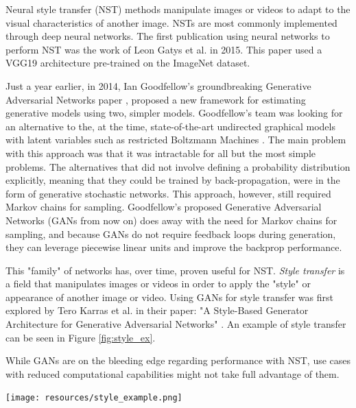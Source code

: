 Neural style transfer (NST) methods manipulate images or videos to adapt to the visual characteristics of another image. NSTs are most commonly implemented through deep neural networks. The first publication using neural networks to perform NST was the work of Leon Gatys et al.\cite{DBLP:journals/corr/GatysEB15a} in 2015. This paper used a VGG19 architecture pre-trained on the ImageNet dataset. 


Just a year earlier, in 2014, Ian Goodfellow's groundbreaking Generative Adversarial Networks paper \cite{goodfellow2014generative}, proposed a new framework for estimating generative models using two, simpler models. Goodfellow's team was looking for an alternative to the, at the time, state-of-the-art undirected graphical models with latent variables such as restricted Boltzmann Machines \cite{computation_2021, rumelhart86a}. The main problem with this approach was that it was intractable for all but the most simple problems. The alternatives that did not involve defining a probability distribution explicitly, meaning that they could be trained by back-propagation, were in the form of generative stochastic networks\cite{DBLP:journals/corr/BengioT13}. This approach, however, still required Markov chains for sampling. Goodfellow's proposed Generative Adversarial Networks (GANs from now on) does away with the need for Markov chains for sampling, and because GANs do not require feedback loops during generation, they can leverage piecewise linear units and improve the backprop performance.

This "family" of networks has, over time, proven useful for NST. \emph{Style transfer} is a field that manipulates images or videos in order to apply the "style" or appearance of another image or video. Using GANs for style transfer was first explored by Tero Karras et al. in their paper: "A Style-Based Generator Architecture for Generative Adversarial Networks" \cite{stylegan}. An example of style transfer can be seen in Figure \ref{fig:style_ex}.

While GANs are on the bleeding edge regarding performance with NST, use cases with reduced computational capabilities might not take full advantage of them.


\begin{Figure}[h]
 \centering
 \texttt{[image: resources/style\_example.png]}
 \label{fig:style_ex}
\end{Figure}


